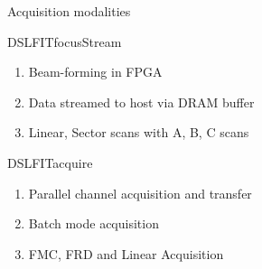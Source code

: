 \documentclass[t,12pt,english
\ifx\beamermode\undefined\else,\beamermode\fi
]{beamer}
\begin{document}
\begin{frame}{Acquisition modalities}

\begin{block}{\footnotesize{DSLFITfocusStream}}\footnotesize{}
\begin{enumerate} 
\vspace{0.05cm}
     \item \footnotesize{Beam-forming in FPGA}
     \item \footnotesize{Data streamed to host via DRAM buffer}
     \item \footnotesize{Linear, Sector scans with A, B, C scans}
\end{enumerate}
\end{block}

\begin{block}{\footnotesize{DSLFITacquire}}\footnotesize{}
\begin{enumerate} 
\vspace{0.05cm}
     \item \footnotesize{Parallel channel acquisition and transfer}
     \item \footnotesize{Batch mode acquisition}
     \item \footnotesize{FMC, FRD and Linear Acquisition}
\end{enumerate}
\end{block}
\end{frame}
\end{document}
